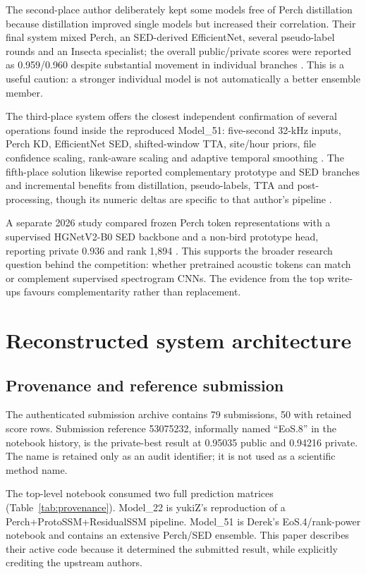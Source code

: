 \documentclass[10pt,a4paper]{article}
\begin{document}
The second-place author deliberately kept some models free of Perch distillation because distillation improved single models but increased their correlation. Their final system mixed Perch, an SED-derived EfficientNet, several pseudo-label rounds and an Insecta specialist; the overall public/private scores were reported as 0.959/0.960 despite substantial movement in individual branches \cite{second2026writeup}. This is a useful caution: a stronger individual model is not automatically a better ensemble member.

The third-place system offers the closest independent confirmation of several operations found inside the reproduced Model\_51: five-second 32-kHz inputs, Perch KD, EfficientNet SED, shifted-window TTA, site/hour priors, file confidence scaling, rank-aware scaling and adaptive temporal smoothing \cite{third2026writeup}. The fifth-place solution likewise reported complementary prototype and SED branches and incremental benefits from distillation, pseudo-labels, TTA and post-processing, though its numeric deltas are specific to that author's pipeline \cite{fifth2026writeup}.

A separate 2026 study compared frozen Perch token representations with a supervised HGNetV2-B0 SED backbone and a non-bird prototype head, reporting private 0.936 and rank 1,894 \cite{miyaguchi2026tokens}. This supports the broader research question behind the competition: whether pretrained acoustic tokens can match or complement supervised spectrogram CNNs. The evidence from the top write-ups favours complementarity rather than replacement.

\section{Reconstructed system architecture}
\subsection{Provenance and reference submission}
The authenticated submission archive contains 79 submissions, 50 with retained score rows. Submission reference 53075232, informally named ``EoS.8'' in the notebook history, is the private-best result at 0.95035 public and 0.94216 private. The name is retained only as an audit identifier; it is not used as a scientific method name.

The top-level notebook consumed two full prediction matrices (Table~\ref{tab:provenance}). Model\_22 is yukiZ's reproduction of a Perch+ProtoSSM+ResidualSSM pipeline. Model\_51 is Derek's EoS.4/rank-power notebook and contains an extensive Perch/SED ensemble. This paper describes their active code because it determined the submitted result, while explicitly crediting the upstream authors.
\end{document}
